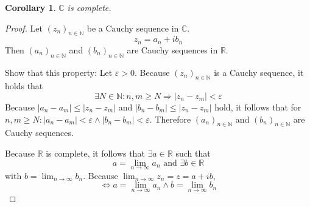 \documentclass[a4paper,landscape,twocolumn]{article}
\newtheorem{cor}{Corollary}
\newcommand\abs[1]{\left|#1\right|}
\newcommand\seq[1]{{\left(#1\right)}_{n \in \mathbb N}}
\begin{document}
\begin{cor}
  $\mathbb C$ is complete.
\end{cor}
\begin{proof}
  Let $\seq{z_n}$ be a Cauchy sequence in $\mathbb C$.
  \[ z_n = a_n + i b_n \]
  Then $\seq{a_n}$ and $\seq{b_n}$ are Cauchy sequences in $\mathbb R$.

  Show that this property: Let $\varepsilon > 0$. Because $\seq{z_n}$ is a Cauchy sequence,
  it holds that
  \[ \exists N \in \mathbb N: n,m \geq N \Rightarrow \abs{z_n - z_m} < \varepsilon \]
  Because $\abs{a_n - a_m} \leq \abs{z_n - z_m}$ and $\abs{b_n - b_m} \leq \abs{z_n - z_m}$ hold,
  it follows that for $n,m \geq N: \abs{a_n - a_m} < \varepsilon \land \abs{b_n - b_m} < \varepsilon$.
  Therefore $\seq{a_n}$ and $\seq{b_n}$ are Cauchy sequences.

  Because $\mathbb R$ is complete, it follows that $\exists a \in \mathbb R$ such that
  \[ a = \lim_{n\to\infty} a_n \text{ and } \exists b \in \mathbb R \]
  with $b = \lim_{n\to\infty} b_n$. Because $\lim_{n\to\infty} z_n = z = a + ib$,
  \[ \Leftrightarrow a = \lim_{n\to\infty} a_n \land b = \lim_{n\to\infty} b_n \]
\end{proof}
\end{document}
